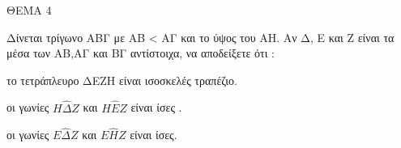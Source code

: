 
ΘΕΜΑ 4

Δίνεται τρίγωνο ΑΒΓ με ΑΒ \textless{} ΑΓ και το ύψος του ΑΗ. Αν Δ, Ε και Ζ είναι τα μέσα των ΑΒ,ΑΓ και ΒΓ αντίστοιχα, να αποδείξετε ότι :

\begin{alist}
\item το τετράπλευρο ΔΕΖΗ είναι ισοσκελές τραπέζιο. 

\item οι γωνίες $Η\widehat{\Delta}Ζ$ και $Η\widehat{Ε}Ζ$ είναι ίσες . 

\item οι γωνίες $Ε\widehat{\Delta}Ζ$ και $Ε\widehat{Η}Ζ$ είναι ίσες. 
\end{alist}
